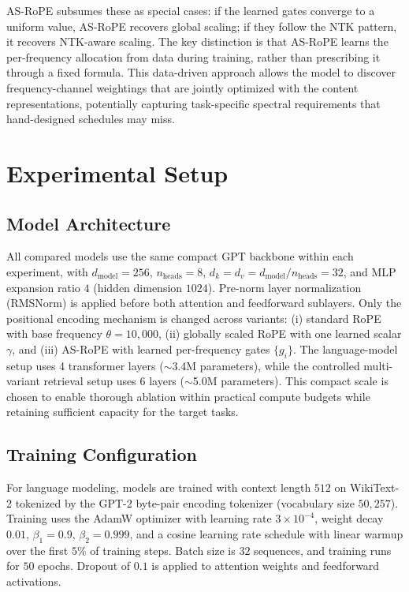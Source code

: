 \documentclass[conference]{IEEEtran}
\begin{document}
AS-RoPE subsumes these as special cases: if the learned gates converge to a uniform value, AS-RoPE recovers global scaling; if they follow the NTK pattern, it recovers NTK-aware scaling. The key distinction is that AS-RoPE learns the per-frequency allocation from data during training, rather than prescribing it through a fixed formula. This data-driven approach allows the model to discover frequency-channel weightings that are jointly optimized with the content representations, potentially capturing task-specific spectral requirements that hand-designed schedules may miss.

\section{Experimental Setup}

\subsection{Model Architecture}
All compared models use the same compact GPT backbone within each experiment, with $d_{\text{model}}=256$, $n_{\text{heads}}=8$, $d_k = d_v = d_{\text{model}}/n_{\text{heads}} = 32$, and MLP expansion ratio $4$ (hidden dimension $1024$). Pre-norm layer normalization (RMSNorm) is applied before both attention and feedforward sublayers. Only the positional encoding mechanism is changed across variants: (i) standard RoPE with base frequency $\theta=10{,}000$, (ii) globally scaled RoPE with one learned scalar $\gamma$, and (iii) AS-RoPE with learned per-frequency gates $\{g_i\}$. The language-model setup uses 4 transformer layers ($\sim$3.4M parameters), while the controlled multi-variant retrieval setup uses 6 layers ($\sim$5.0M parameters). This compact scale is chosen to enable thorough ablation within practical compute budgets while retaining sufficient capacity for the target tasks.

\subsection{Training Configuration}
For language modeling, models are trained with context length $512$ on WikiText-2 \cite{merity2017pointer} tokenized by the GPT-2 byte-pair encoding tokenizer (vocabulary size $50{,}257$). Training uses the AdamW optimizer with learning rate $3 \times 10^{-4}$, weight decay $0.01$, $\beta_1 = 0.9$, $\beta_2 = 0.999$, and a cosine learning rate schedule with linear warmup over the first $5\%$ of training steps. Batch size is $32$ sequences, and training runs for $50$ epochs. Dropout of $0.1$ is applied to attention weights and feedforward activations.
\end{document}
